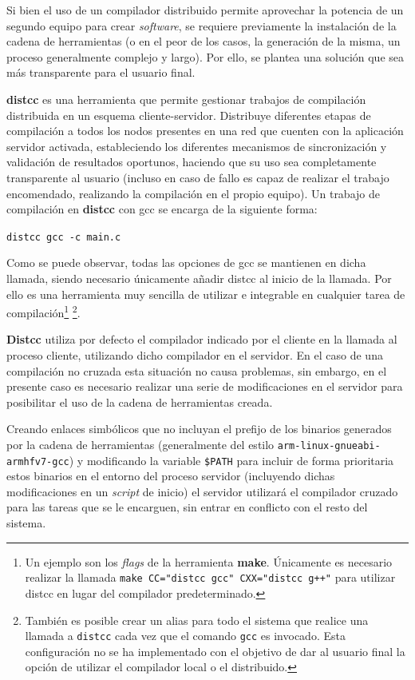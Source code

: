 Si bien el uso de un compilador distribuido permite aprovechar la potencia de un segundo equipo para crear \textit{software}, se requiere previamente la instalación de la cadena de herramientas (o en el peor de los casos, la generación de la misma, un proceso generalmente complejo y largo). Por ello, se plantea una solución que sea más transparente para el usuario final.

\textbf{distcc} es una herramienta que permite gestionar trabajos de compilación distribuida en un esquema cliente-servidor. Distribuye diferentes etapas de compilación a todos los nodos presentes en una red que cuenten con la aplicación servidor activada, estableciendo los diferentes mecanismos de sincronización y validación de resultados oportunos, haciendo que su uso sea completamente transparente al usuario (incluso en caso de fallo es capaz de realizar el trabajo encomendado, realizando la compilación en el propio equipo). Un trabajo de compilación en \textbf{distcc} con gcc se encarga de la siguiente forma:

\texttt{distcc gcc -c main.c}

Como se puede observar, todas las opciones de gcc se mantienen en dicha llamada, siendo necesario únicamente añadir distcc al inicio de la llamada. Por ello es una herramienta muy sencilla de utilizar e integrable en cualquier tarea de compilación\footnote{Un ejemplo son los \textit{flags} de la herramienta \textbf{make}. Únicamente es necesario realizar la llamada \texttt{make CC="distcc gcc" CXX="distcc g++"} para utilizar distcc en lugar del compilador predeterminado.} \footnote{También es posible crear un alias para todo el sistema que realice una llamada a \texttt{distcc} cada vez que el comando \texttt{gcc} es invocado. Esta configuración no se ha implementado con el objetivo de dar al usuario final la opción de utilizar el compilador local o el distribuido.}.

\textbf{Distcc} utiliza por defecto el compilador indicado por el cliente en la llamada al proceso cliente, utilizando dicho compilador en el servidor. En el caso de una compilación no cruzada esta situación no causa problemas, sin embargo, en el presente caso es necesario realizar una serie de modificaciones en el servidor para posibilitar el uso de la cadena de herramientas creada.

Creando enlaces simbólicos que no incluyan el prefijo de los binarios generados por la cadena de herramientas (generalmente del estilo \texttt{arm-linux-gnueabi-armhfv7-gcc}) y modificando la variable \texttt{\$PATH} para incluir de forma prioritaria estos binarios en el entorno del proceso servidor (incluyendo dichas modificaciones en un \textit{script} de inicio) el servidor utilizará el compilador cruzado para las tareas que se le encarguen, sin entrar en conflicto con el resto del sistema.

